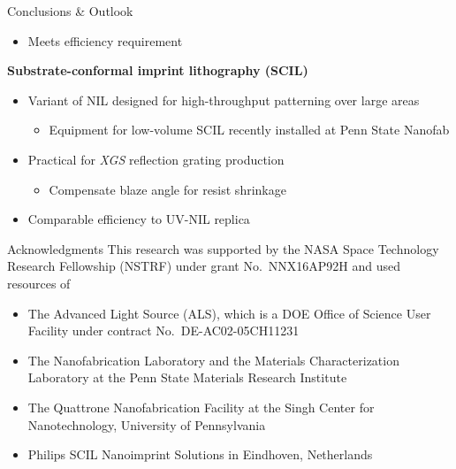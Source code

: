 \documentclass[aspectratio=169,9pt]{beamer}
\begin{document}
\begin{frame}{Conclusions \& Outlook}
\begin{minipage}[t]{0.48\linewidth}
\begin{itemize}
  \begin{itemize}
    \item[$\square$] Provides way for radially-ruled, blazed grating layout to be generated with EBL precision 
    \item[$\implies$] Enables high $\mathscr{R}$ %
  \end{itemize}
  \item Meets efficiency requirement
  \end{itemize}
\textbf{Substrate-conformal imprint lithography (SCIL)}
\begin{itemize}
  \item Variant of NIL designed for high-throughput patterning over large areas 
  \begin{itemize}
    \item[$\square$] Equipment for low-volume SCIL recently installed at Penn State Nanofab
  \end{itemize}
  \item Practical for \emph{XGS} reflection grating production
  \begin{itemize}
    \item[$\square$] Compensate blaze angle for resist shrinkage%
  \end{itemize}
  \item Comparable efficiency to UV-NIL replica
  \end{itemize}
\end{minipage}
\end{frame}

\begin{frame}{Acknowledgments}
This research was supported by the NASA Space Technology Research Fellowship (NSTRF) under grant No.\ NNX16AP92H and used resources of 
\begin{itemize}
  \item The Advanced Light Source (ALS), which is a DOE Office of Science User Facility under contract No.\ DE-AC02-05CH11231
  \item The Nanofabrication Laboratory and the Materials Characterization Laboratory at the Penn State Materials Research Institute
  \item The Quattrone Nanofabrication Facility at the Singh Center for Nanotechnology, University of Pennsylvania
  \item Philips SCIL Nanoimprint Solutions in Eindhoven, Netherlands
  \end{itemize}
\end{frame}
\end{document}
